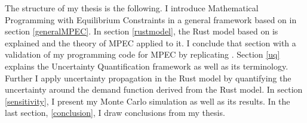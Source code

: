 The structure of my thesis is the following. I introduce Mathematical Programming with Equilibrium Constraints in a general framework based on \cite{Su.Judd.2012} in section \ref{generalMPEC}. In section \ref{rustmodel}, the Rust model based on \cite{Rust.1987} is explained and the theory of MPEC applied to it. I conclude that section with a validation of my programming code for MPEC by replicating \cite{Iskhakov.2016}. Section \ref{uq} explains the Uncertainty Quantification framework as well as its terminology. Further I apply uncertainty propagation in the Rust model by quantifying the uncertainty around the demand function derived from the Rust model. In section \ref{sensitivity}, I present my Monte Carlo simulation as well as its results. In the last section, \ref{conclusion}, I draw conclusions from my thesis.

